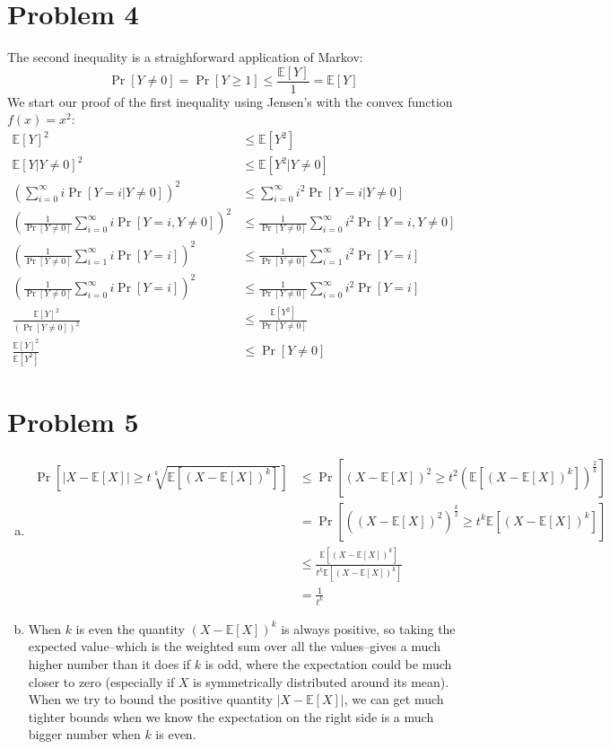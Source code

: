 \documentclass[11pt]{article}
\newcommand{\E}{\mathbb{E}}
\begin{document}
\newpage
\section*{Problem 4}
The second inequality is a straighforward application of Markov: $$\Pr[Y\neq 0]=\Pr[Y\geq 1]\leq\frac{\E[Y]}{1}=\E[Y]$$
We start our proof of the first inequality using Jensen's with the convex function $f(x)=x^2$: \begin{align*}
\E[Y]^2 &\leq \E[Y^2]\\
\E[Y|Y\neq0]^2 &\leq \E[Y^2|Y\neq0]\\
\left(\sum_{i=0}^{\infty}i\Pr[Y=i|Y\neq0]\right)^2 &\leq \sum_{i=0}^{\infty}i^2\Pr[Y=i|Y\neq0]\\
\left(\frac1{\Pr[Y\neq0]}\sum_{i=0}^{\infty}i\Pr[Y=i,Y\neq0]\right)^2 &\leq \frac1{\Pr[Y\neq0]}\sum_{i=0}^{\infty}i^2\Pr[Y=i,Y\neq0]\\
\left(\frac1{\Pr[Y\neq0]}\sum_{i=1}^{\infty}i\Pr[Y=i]\right)^2 &\leq \frac1{\Pr[Y\neq0]}\sum_{i=1}^{\infty}i^2\Pr[Y=i]\\
\left(\frac1{\Pr[Y\neq0]}\sum_{i=0}^{\infty}i\Pr[Y=i]\right)^2 &\leq \frac1{\Pr[Y\neq0]}\sum_{i=0}^{\infty}i^2\Pr[Y=i]\\
\frac{\E[Y]^2}{(\Pr[Y\neq0])^2} &\leq \frac{\E[Y^2]}{\Pr[Y\neq0]}\\
\frac{\E[Y]^2}{\E[Y^2]} &\leq \Pr[Y\neq0]
\end{align*}


\newpage
\section*{Problem 5}
\begin{enumerate}[(a)]
\item \begin{align*}
\Pr\left[|X-\E[X]|\geq t\sqrt[k]{\E[(X-\E[X])^k]}\right] &\leq \Pr\left[(X-\E[X])^2\geq t^2(\E[(X-\E[X])^k])^{\frac2k}\right]\\
&= \Pr\left[((X-\E[X])^2)^{\frac k2}\geq t^k\E[(X-\E[X])^k]\right]\\
&\leq \frac{\E[(X-\E[X])^k]}{t^k\E[(X-\E[X])^k]}\\
&= \frac1{t^k}
\end{align*}
\item When $k$ is even the quantity $(X-\E[X])^k$ is always positive, so taking the expected value--which is the weighted sum over all the values--gives a much higher number than it does if $k$ is odd, where the expectation could be much closer to zero (especially if $X$ is symmetrically distributed around its mean). When we try to bound the positive quantity $|X-\E[X]|$, we can get much tighter bounds when we know the expectation on the right side is a much bigger number when $k$ is even.
\end{enumerate}
\end{document}

